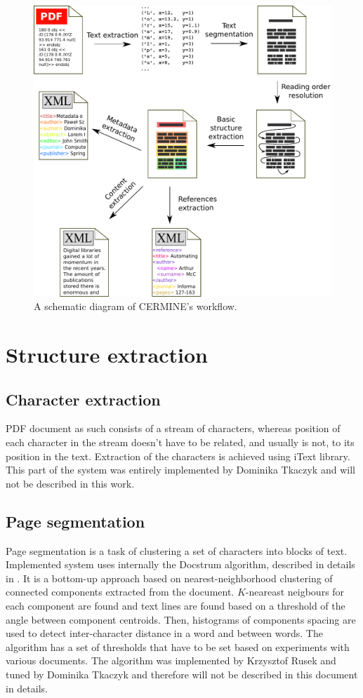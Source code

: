 \begin{figure}[h]
  \centering
  \includegraphics[width=14cm]{graphics/pipeline}
  \caption{A schematic diagram of CERMINE's workflow.}
  \label{fig:pipeline}
\end{figure}

\section{Structure extraction}
\subsection{Character extraction}\label{sec:character_extraction}
PDF document as such consists of a stream of characters, whereas position of each character in the stream doesn't have to be related, and usually is not, to its position in the text. Extraction of the characters is achieved using iText library. This part of the system was entirely implemented by Dominika Tkaczyk and will not be described in this work.

\subsection{Page segmentation}\label{sec:page_segmentation}
Page segmentation is a task of clustering a set of characters into blocks of text. Implemented system uses internally the Docstrum algorithm, described in details in \cite{O'Gorman1993}. It is a bottom-up approach based on nearest-neighborhood clustering of connected components extracted from the document. $K$-neareast neigbours for each component are found and text lines are found based on a threshold of the angle between component centroids. Then, histograms of components spacing are used to detect inter-character distance in a word and between words. The algorithm has a set of thresholds that have to be set based on experiments with various documents. The algorithm was implemented by Krzysztof Rusek and tuned by Dominika Tkaczyk and therefore will not be described in this document in details.


